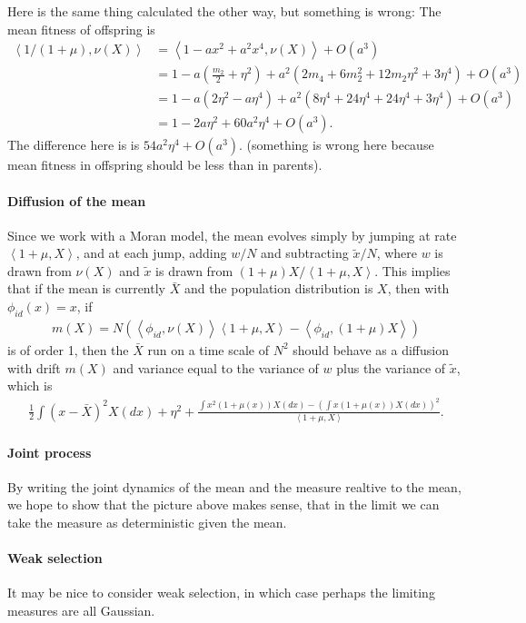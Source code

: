 \documentclass{article}
\newcommand{\ip}[2]{\left\langle #1, #2 \right\rangle}
\begin{document}
Here is the same thing calculated the other way,
but something is wrong:
The mean fitness of offspring is
$$\begin{aligned}
    \ip{1/(1+\mu)}{\nu(X)}
    &=
    \ip{1 - ax^2 + a^2 x^4}{\nu(X)} + O(a^3) \\
    &=
    1 - a \left( \frac{m_2}{2} + \eta^2 \right) 
        + a^2 \left( 2 m_4 + 6 m_2^2 + 12 m_2 \eta^2 + 3 \eta^4\right) + O(a^3) \\
    &=
    1 - a \left( 2 \eta^2 - a \eta^4 \right)
        + a^2 \left( 8 \eta^4 + 24 \eta^4 + 24 \eta^4 + 3 \eta^4\right) + O(a^3) \\
    &=
    1 - 2 a \eta^2 + 60 a^2 \eta^4 + O(a^3) .
\end{aligned}$$
The difference here is
is $54 a^2 \eta^4 + O(a^3)$.
(something is wrong here because mean fitness in offspring should be less than in parents).



\paragraph{Diffusion of the mean}
Since we work with a Moran model,
the mean evolves simply by jumping at rate $\ip{1+\mu}{X}$,
and at each jump, adding $w/N$ and subtracting $\tilde x/N$,
where $w$ is drawn from $\nu(X)$ and $\tilde x$ is drawn from 
$(1+\mu)X/\ip{1+\mu}{X}$.
This implies that if the mean is currently $\bar X$
and the population distribution is $X$,
then with $\phi_{id}(x) = x$,
if
\begin{align*}
    m(X) = N \left( \ip{\phi_{id}}{\nu(X)}\ip{1+\mu}{X}
    -
    \ip{\phi_{id}}{(1+\mu)X} \right)
\end{align*}
is of order 1,
then
the $\bar X$ run on a time scale of $N^2$
should behave as a diffusion with drift $m(X)$
and variance equal to the variance of $w$ plus the variance of $\tilde x$, which is
\begin{align*}
    \frac{1}{2} \int (x-\bar X)^2 X(dx) + \eta^2
    + \frac{ \int x^2 (1+\mu(x)) X(dx)  
    - \left(\int x (1+\mu(x)) X(dx)\right)^2 }{ \ip{1+\mu}{X} } .
\end{align*}

\paragraph{Joint process}
By writing the joint dynamics of the mean and the measure realtive to the mean,
we hope to show that the picture above makes sense,
that in the limit we can take the measure as deterministic given the mean.

\paragraph{Weak selection}
It may be nice to consider weak selection,
in which case perhaps the limiting measures are all Gaussian.
\end{document}
